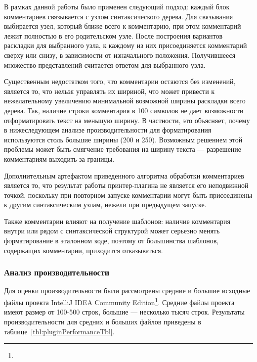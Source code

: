 В рамках данной работы было применен следующий подход: каждый блок комментариев
связывается с узлом синтаксического дерева. Для связывания выбирается узел, который
ближе всего к комментарию, при этом комментарий лежит полностью в его родительском узле.
После построения вариантов раскладки для выбранного узла, к каждому из них
присоединяется комментарий сверху или снизу, в зависимости от изначального положения.
Получившееся множество представлений считается ответом для выбранного узла.

Существенным недостатком того, что комментарии остаются без изменений,
является то, что нельзя управлять их шириной, что может привести к нежелательному
увеличению минимальной возможной ширины раскладки всего дерева.
Так, наличие строки комментария в
100 символов не дает возможности отформатировать текст на меньшую ширину.
В частности, это объясняет, почему в нижеследующем анализе производительности для
форматирования используются столь большие ширины (200 и 250). Возможным решением
этой проблемы может быть смягчение требования на ширину текста --- разрешение
комментариям выходить за границы.

Дополнительным артефактом приведенного алгоритма обработки комментариев является то,
что результат работы
принтер-плагина не является его неподвижной точкой, поскольку при повторном запуске
комментарии могут быть присоединены к другим синтаксическим узлам, нежели при предыдущем
запуске.

Также комментарии влияют на получение шаблонов:
наличие комментария внутри или рядом с синтаксической структурой
может серьезно менять форматирование в эталонном коде, поэтому от большинства
шаблонов, содержащих комментарии, приходится отказываться.

\newpage
\subsubsection{Анализ производительности}

Для оценки производительности были рассмотрены средние и большие исходные файлы
проекта IntelliJ IDEA Community
Edition\footnote{}.
Средние файлы проекта имеют размер от 100-500 строк, большие --- несколько тысяч строк.
Результаты производительности для средних и больших файлов приведены в
таблице~\ref{tbl:pluginPerformanceTbl}.

